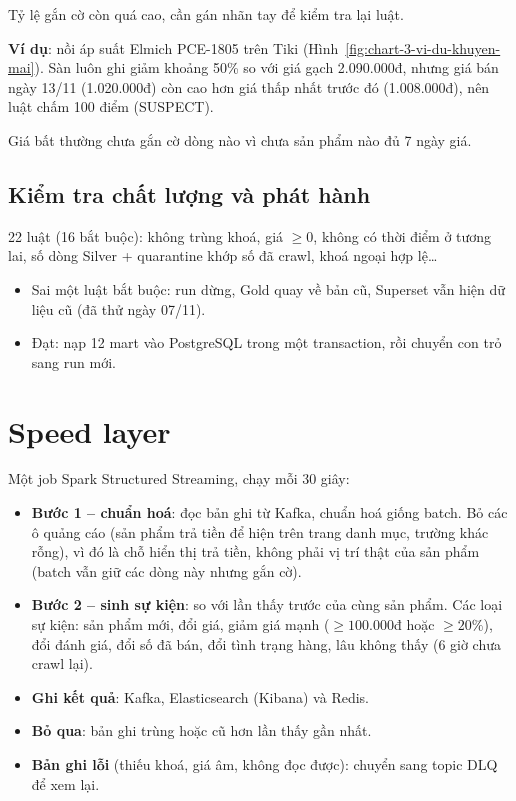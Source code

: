 \documentclass[11pt,a4paper]{article}
\begin{document}
Tỷ lệ gắn cờ còn quá cao, cần gán nhãn tay để kiểm tra lại luật.

\textbf{Ví dụ}: nồi áp suất Elmich PCE-1805 trên Tiki (Hình~\ref{fig:chart-3-vi-du-khuyen-mai}).
Sàn luôn ghi giảm khoảng 50\% so với giá gạch 2.090.000đ, nhưng giá bán ngày 13/11 (1.020.000đ) còn cao hơn giá thấp nhất trước đó (1.008.000đ),
nên luật chấm 100 điểm (SUSPECT).


Giá bất thường chưa gắn cờ dòng nào vì chưa sản phẩm nào đủ 7 ngày giá.

\subsection{Kiểm tra chất lượng và phát hành}
22 luật (16 bắt buộc): không trùng khoá, giá $\ge 0$, không có thời điểm ở tương lai, số dòng Silver + quarantine khớp số đã crawl, khoá ngoại hợp lệ\ldots
\begin{itemize}
  \item Sai một luật bắt buộc: run dừng, Gold quay về bản cũ, Superset vẫn hiện dữ liệu cũ (đã thử ngày 07/11).
  \item Đạt: nạp 12 mart vào PostgreSQL trong một transaction, rồi chuyển con trỏ sang run mới.
\end{itemize}

\section{Speed layer}
Một job Spark Structured Streaming, chạy mỗi 30 giây:
\begin{itemize}
  \item \textbf{Bước 1 -- chuẩn hoá}: đọc bản ghi từ Kafka, chuẩn hoá giống batch.
        Bỏ các ô quảng cáo (sản phẩm trả tiền để hiện trên trang danh mục, trường  khác rỗng),
        vì đó là chỗ hiển thị trả tiền, không phải vị trí thật của sản phẩm (batch vẫn giữ các dòng này nhưng gắn cờ).
  \item \textbf{Bước 2 -- sinh sự kiện}: so với lần thấy trước của cùng sản phẩm. Các loại sự kiện:
        sản phẩm mới, đổi giá, giảm giá mạnh ($\ge 100.000$đ hoặc $\ge 20\%$), đổi đánh giá, đổi số đã bán,
        đổi tình trạng hàng, lâu không thấy (6 giờ chưa crawl lại).
  \item \textbf{Ghi kết quả}: Kafka, Elasticsearch (Kibana) và Redis.
  \item \textbf{Bỏ qua}: bản ghi trùng hoặc cũ hơn lần thấy gần nhất.
  \item \textbf{Bản ghi lỗi} (thiếu khoá, giá âm, không đọc được): chuyển sang topic DLQ để xem lại.
\end{itemize}
\end{document}
